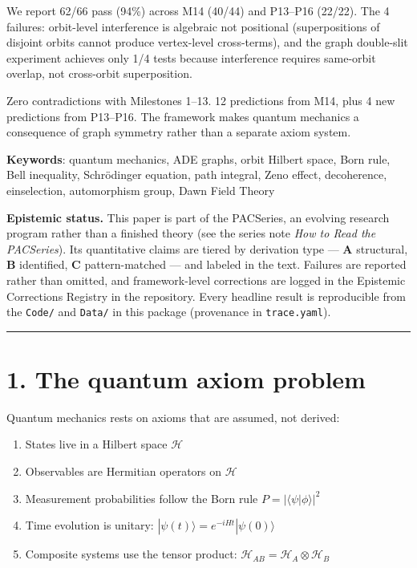 \documentclass[11pt,a4paper]{article}
\providecommand{\tightlist}{\setlength{\itemsep}{0pt}\setlength{\parskip}{0pt}}
\begin{document}
We report 62/66 pass (94\%) across M14 (40/44) and P13–P16 (22/22). The 4 failures: orbit-level interference is algebraic not positional (superpositions of disjoint orbits cannot produce vertex-level cross-terms), and the graph double-slit experiment achieves only 1/4 tests because interference requires same-orbit overlap, not cross-orbit superposition.

Zero contradictions with Milestones 1–13. 12 predictions from M14, plus 4 new predictions from P13–P16. The framework makes quantum mechanics a consequence of graph symmetry rather than a separate axiom system.

\textbf{Keywords}: quantum mechanics, ADE graphs, orbit Hilbert space, Born rule, Bell inequality, Schrödinger equation, path integral, Zeno effect, decoherence, einselection, automorphism group, Dawn Field Theory

\textbf{Epistemic status.} This paper is part of the PACSeries, an evolving research program rather than a finished theory (see the series note \emph{How to Read the PACSeries}). Its quantitative claims are tiered by derivation type — \textbf{A} structural, \textbf{B} identified, \textbf{C} pattern-matched — and labeled in the text. Failures are reported rather than omitted, and framework-level corrections are logged in the Epistemic Corrections Registry in the repository. Every headline result is reproducible from the \texttt{Code/} and \texttt{Data/} in this package (provenance in \texttt{trace.yaml}).

\begin{center}\rule{0.5\linewidth}{0.4pt}\end{center}

\section*{1. The quantum axiom problem}

Quantum mechanics rests on axioms that are assumed, not derived:

\begin{enumerate}\tightlist
\item States live in a Hilbert space $\mathcal{H}$
\item Observables are Hermitian operators on $\mathcal{H}$
\item Measurement probabilities follow the Born rule $P = |\langle \psi | \phi \rangle|^2$
\item Time evolution is unitary: $|\psi(t)\rangle = e^{-iHt} |\psi(0)\rangle$
\item Composite systems use the tensor product: $\mathcal{H}_{AB} = \mathcal{H}_A \otimes \mathcal{H}_B$
\end{enumerate}
\end{document}

